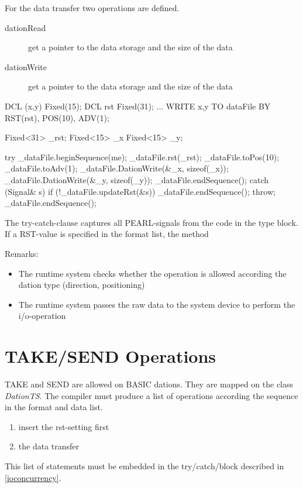 For the data transfer two operations are defined. 

\begin{description}
\item[dationRead]{get a pointer to the data storage and the size of the data}
\item[dationWrite]{get a pointer to the data storage and the size of the data}
\end{description}


\begin{PEARLCode}
DCL (x,y) Fixed(15);
DCL rst Fixed(31);
...
WRITE x,y TO dataFile BY RST(rst), POS(10), ADV(1);
\end{PEARLCode}

\begin{CppCode}
Fixed<31> _rst;
Fixed<15> _x
Fixed<15> _y;

try {
   _dataFile.beginSequence(me);
   _dataFile.rst(_rst);
   _dataFile.toPos(10);
   _dataFile.toAdv(1);
   _dataFile.DationWrite(&_x, sizeof(_x));
   _dataFile.DationWrite(&_y, sizeof(_y));
   _dataFile.endSequence();
} catch (Signal& s) {
   if (!_dataFile.updateRst(&s)) {
      _dataFile.endSequence();
      throw;
   }
   _dataFile.endSequence();
}
\end{CppCode}

The try-catch-clause captures all PEARL-signals from the code in the 
type block. If a RST-value is specified in the format list, the method

Remarks:
\begin{itemize}
\item The runtime system checks whether the operation is allowed according
    the dation type (direction, positioning)
\item The runtime system passes the raw data to the system device to
   perform the i/o-operation
\end{itemize}

\section{TAKE/SEND Operations}
TAKE and SEND are allowed on BASIC dations. They are mapped on the
class {\em DationTS}. 
The compiler must produce a list of operations according the sequence 
in the format and data list.
\begin{enumerate}
\item insert the rst-setting first
\item the data transfer 
\end{enumerate}
This list of statements must be embedded in the try/catch/block described in
\ref{ioconcurrency}.

